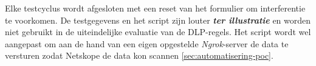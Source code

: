 Elke testcyclus wordt afgesloten met een reset van het formulier om interferentie te voorkomen. 
De testgegevens en het script zijn louter \textbf{\textit{ter illustratie}} en worden niet gebruikt in de uiteindelijke evaluatie van de DLP-regels.
Het script wordt wel aangepast om aan de hand van een eigen opgestelde \textit{Ngrok}-server de data te versturen zodat Netskope de data kon scannen \ref{sec:automatisering-poc}.



    
    
    
    
    
    
    
    

